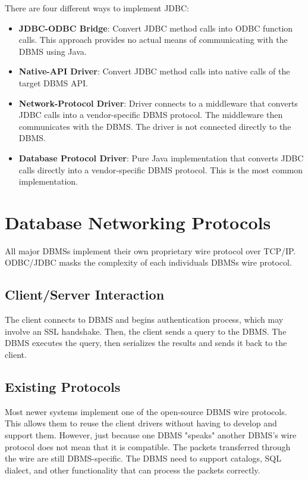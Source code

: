 \documentclass[11pt]{article}
\begin{document}
There are four different ways to implement JDBC:
\begin{itemize}
    \item \textbf{JDBC-ODBC Bridge}: Convert JDBC method calls into ODBC function calls. This approach provides no actual means of communicating with the DBMS using Java.
    \item \textbf{Native-API Driver}: Convert JDBC method calls into native calls of the target DBMS API.
    \item \textbf{Network-Protocol Driver}: Driver connects to a middleware that converts JDBC calls into a vendor-specific DBMS protocol. The middleware then communicates with the DBMS. The driver is not connected directly to the DBMS.
    \item \textbf{Database Protocol Driver}: Pure Java implementation that converts JDBC calls directly into a vendor-specific DBMS protocol. This is the most common implementation.
\end{itemize}

\section{Database Networking Protocols}
All major DBMSs implement their own proprietary wire protocol over TCP/IP. ODBC/JDBC masks the complexity of each individuals DBMSs wire protocol.

\subsection*{Client/Server Interaction}
The client connects to DBMS and begins authentication process, which may involve an SSL handshake. Then, the client sends a query to the DBMS. The DBMS executes the query, then serializes the results and sends it back to the client.

\subsection*{Existing Protocols}
Most newer systems implement one of the open-source DBMS wire protocols. This allows them to reuse the client drivers without having to develop and support them. However, just because one DBMS "speaks" another DBMS's wire protocol does not mean that it is compatible. The packets transferred through the wire are still DBMS-specific. The DBMS need to support catalogs, SQL dialect, and other functionality that can process the packets correctly.
\end{document}
